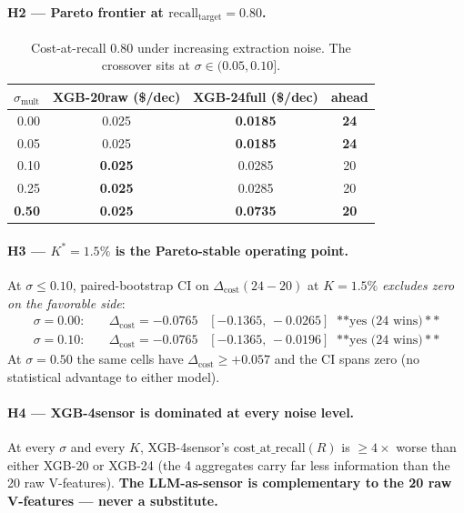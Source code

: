 \paragraph{H2 --- Pareto frontier at $\mathrm{recall}_{\text{target}} = 0.80$.}

\begin{table}[h]
\centering
\small
\begin{tabular}{rccc}
\toprule
$\sigma_{\text{mult}}$ & XGB-20raw (\$/dec) & XGB-24full (\$/dec) & ahead \\
\midrule
0.00 & 0.025 & \textbf{0.0185} & \textbf{24} \\
0.05 & 0.025 & \textbf{0.0185} & \textbf{24} \\
0.10 & \textbf{0.025} & 0.0285 & 20 \\
0.25 & \textbf{0.025} & 0.0285 & 20 \\
\textbf{0.50} & \textbf{0.025} & \textbf{0.0735} & \textbf{20} \\
\bottomrule
\end{tabular}
\caption{Cost-at-recall $0.80$ under increasing extraction noise.
The crossover sits at $\sigma \in (0.05, 0.10]$.}
\label{tab:p8-noise-cost-pareto-80}
\end{table}

\paragraph{H3 --- $K^* = 1.5\%$ is the Pareto-stable operating point.}
At $\sigma \le 0.10$, paired-bootstrap CI on
$\Delta_{\mathrm{cost}}(24{-}20)$ at $K = 1.5\%$ \emph{excludes zero on
the favorable side}:
\begin{align*}
  \sigma = 0.00: &\quad \Delta_{\text{cost}} = -0.0765 \;\;\;[-0.1365,\,-0.0265] \;\;\text{**yes (24 wins)}** \\
  \sigma = 0.10: &\quad \Delta_{\text{cost}} = -0.0765 \;\;\;[-0.1365,\,-0.0196] \;\;\text{**yes (24 wins)}**
\end{align*}
At $\sigma = 0.50$ the same cells have $\Delta_{\text{cost}} \ge
+0.057$ and the CI spans zero (no statistical advantage to either model).

\paragraph{H4 --- XGB-4sensor is dominated at every noise level.}
At every $\sigma$ and every $K$, XGB-4sensor's
$\mathrm{cost\_at\_recall}(R)$ is $\ge 4\times$ worse than either XGB-20 or
XGB-24 (the 4 aggregates carry far less information than the 20 raw V-features).
\textbf{The LLM-as-sensor is complementary to the 20 raw V-features
--- never a substitute.}

